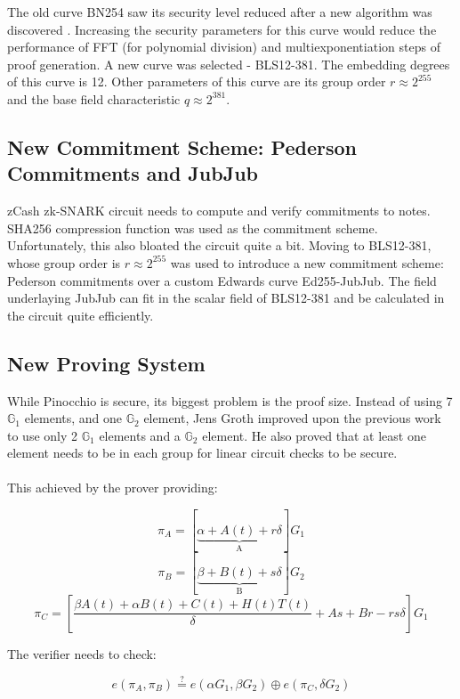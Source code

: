 The old curve BN254 saw its security level reduced after a new algorithm was discovered \cite{zcashbls12381}. Increasing the security parameters for this curve would reduce the performance of FFT (for polynomial division) and multiexponentiation steps of proof generation. A new curve was selected - BLS12-381. The embedding degrees of this curve is 12. Other parameters of this curve are its group order $r \approx 2^{255}$ and the base field characteristic $q \approx 2^{381}$.

\subsection{New Commitment Scheme: Pederson Commitments and JubJub}

zCash zk-SNARK circuit needs to compute and verify commitments to notes. SHA256 compression function was used as the commitment scheme. Unfortunately, this also bloated the circuit quite a bit. Moving to BLS12-381, whose group order is $r \approx 2^{255}$ was used to introduce a new commitment scheme: Pederson commitments over a custom Edwards curve Ed255-JubJub\cite{zcashjubjub}. The field underlaying JubJub can fit in the scalar field of BLS12-381 and be calculated in the circuit quite efficiently.

\subsection{New Proving System}
\label{grothexpl}

While Pinocchio is secure, its biggest problem is the proof size. Instead of using 7 $\mathbb{G}_1$ elements, and one $\mathbb{G}_2$ element, Jens Groth\cite{groth2016size} improved upon the previous work to use only 2 $\mathbb{G}_1$ elements and a $\mathbb{G}_2$ element. He also proved that at least one element needs to be in each group for linear circuit checks to be secure.\\
\\
This achieved by the prover providing:

$$ \pi_A = [\underbrace{\alpha + A(t) + r\delta}_\text{A}]G_1 $$
$$ \pi_B = [\underbrace{\beta + B(t) + s\delta}_\text{B}]G_2 $$
$$ \pi_C = [\frac{\beta A(t) + \alpha B(t) + C(t) + H(t)T(t)}{\delta} + As + Br - rs\delta]G_1 $$

The verifier needs to check:

$$ e(\pi_A, \pi_B) \stackrel{?}{=} e(\alpha G_1, \beta G_2) \oplus e(\pi_C, \delta G_2) $$


